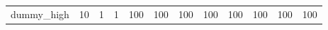 \begin{tabular}{llllllllllll}
dummy_high & {\cellcolor[HTML]{E9F7FA}} \color[HTML]{000000} 10 & {\cellcolor[HTML]{F6FCFD}} \color[HTML]{000000} 1 & {\cellcolor[HTML]{F6FCFD}} \color[HTML]{000000} 1 & {\cellcolor[HTML]{00441B}} \color[HTML]{F1F1F1} 100 & {\cellcolor[HTML]{00441B}} \color[HTML]{F1F1F1} 100 & {\cellcolor[HTML]{00441B}} \color[HTML]{F1F1F1} 100 & {\cellcolor[HTML]{00441B}} \color[HTML]{F1F1F1} 100 & {\cellcolor[HTML]{00441B}} \color[HTML]{F1F1F1} 100 & {\cellcolor[HTML]{00441B}} \color[HTML]{F1F1F1} 100 & {\cellcolor[HTML]{00441B}} \color[HTML]{F1F1F1} 100 & {\cellcolor[HTML]{00441B}} \color[HTML]{F1F1F1} 100 \\
\end{tabular}
